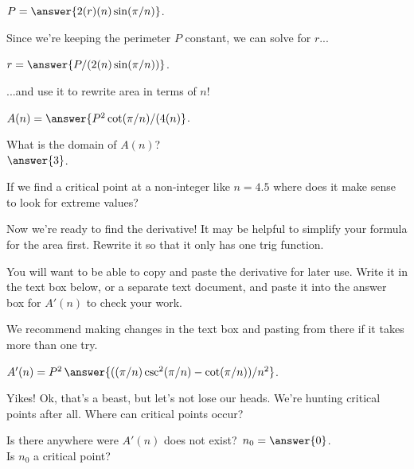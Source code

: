 \documentclass[handout,nooutcomes]{ximera}
\begin{document}
$P = \answer{2(r)(n)\sin(\pi/n)}$.

Since we're keeping the perimeter $P$ constant, we can solve for $r$...

$r = \answer{P/(2(n)\sin(\pi/n))}$.

...and use it to rewrite area in terms of $n$!

$A(n) = \answer{P^2\cot(\pi/n)/(4(n)}$.

\bigskip

What is the domain of $A(n)$? \\
  $\answer{3}$.\\
\begin{freeResponse}
If we find a critical point at a non-integer like $n = 4.5$ where does it make sense to look for extreme values?
\end{freeResponse}

\bigskip

\hspace{2cm}Now we're ready to find the derivative! It may be helpful to simplify your formula for the area first. Rewrite it so that it only has one trig function.

You will want to be able to copy and paste the derivative for later use. Write it in the text box below, or a separate text document, and paste it into the answer box for $A'(n)$ to check your work.

\begin{freeResponse}
We recommend making changes in the text box and pasting from there if it takes more than one try.
\end{freeResponse}

$A'(n) = P^2\,\answer{((\pi/n)\csc^2(\pi/n)-\cot(\pi/n))/n^2}$.

\bigskip

\hspace{2cm}Yikes! Ok, that's a beast, but let's not lose our heads. We're hunting critical points after all. Where can critical points occur?
\begin{selectAll}
\end{selectAll}

\bigskip

Is there anywhere were $A'(n)$ does not exist? $\,n_0 = \answer{0}$.\\
Is $n_0$ a critical point?\\
\begin{multipleChoice}
\end{multipleChoice}
\end{document}
